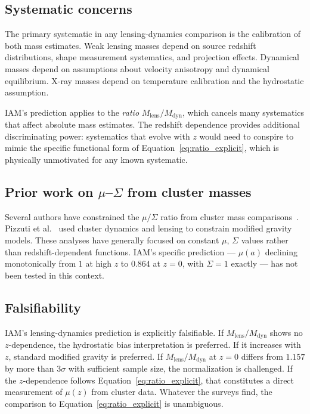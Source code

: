 \documentclass[12pt,a4paper]{article}
\begin{document}
\subsection{Systematic concerns}

The primary systematic in any lensing-dynamics comparison is the calibration of
both mass estimates. Weak lensing masses depend on source redshift distributions,
shape measurement systematics, and projection effects. Dynamical masses depend on
assumptions about velocity anisotropy and dynamical equilibrium. X-ray masses
depend on temperature calibration and the hydrostatic assumption.

IAM's prediction applies to the \textit{ratio} $M_\mathrm{lens}/M_\mathrm{dyn}$,
which cancels many systematics that affect absolute mass estimates. The redshift
dependence provides additional discriminating power: systematics that evolve with
$z$ would need to conspire to mimic the specific functional form of
Equation~\ref{eq:ratio_explicit}, which is physically unmotivated for any known
systematic.

\subsection{Prior work on $\mu$--$\Sigma$ from cluster masses}

Several authors have constrained the $\mu/\Sigma$ ratio from cluster mass
comparisons~\citep{Terukina2014,Wilcox2015}. Pizzuti et al.~\citep{Pizzuti2017}
used cluster dynamics and lensing to constrain modified gravity models. These
analyses have generally focused on constant $\mu$, $\Sigma$ values rather than
redshift-dependent functions. IAM's specific prediction --- $\mu(a)$ declining
monotonically from $1$ at high $z$ to $0.864$ at $z = 0$, with $\Sigma = 1$
exactly --- has not been tested in this context.

\subsection{Falsifiability}

IAM's lensing-dynamics prediction is explicitly falsifiable. If
$M_\mathrm{lens}/M_\mathrm{dyn}$ shows no $z$-dependence, the hydrostatic bias
interpretation is preferred. If it increases with $z$, standard modified gravity
is preferred. If $M_\mathrm{lens}/M_\mathrm{dyn}$ at $z = 0$ differs from
$1.157$ by more than $3\sigma$ with sufficient sample size, the normalization is
challenged. If the $z$-dependence follows Equation~\ref{eq:ratio_explicit}, that
constitutes a direct measurement of $\mu(z)$ from cluster data. Whatever the
surveys find, the comparison to Equation~\ref{eq:ratio_explicit} is unambiguous.
\end{document}
